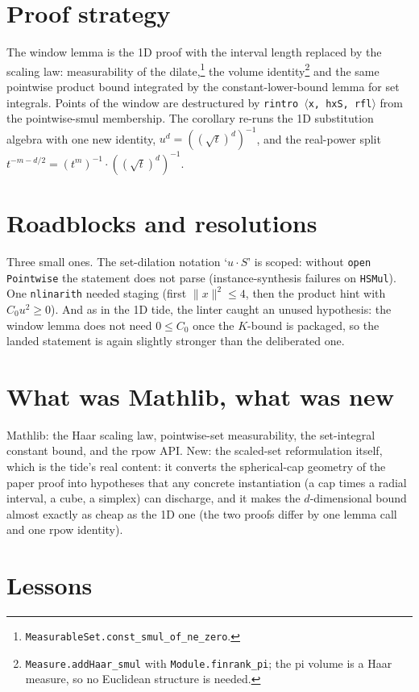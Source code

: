 \documentclass[11pt]{article}
\begin{document}
\section{Proof strategy}

The window lemma is the 1D proof with the interval length replaced by the
scaling law: measurability of the dilate,\footnote{%
\texttt{MeasurableSet.const\_smul\_of\_ne\_zero}.} the volume
identity\footnote{\texttt{Measure.addHaar\_smul} with
\texttt{Module.finrank\_pi}; the pi volume is a Haar measure, so no
Euclidean structure is needed.} and the same pointwise product bound
integrated by the constant-lower-bound lemma for set integrals. Points of
the window are destructured by \texttt{rintro
\(\langle\)x, hxS, rfl\(\rangle\)} from the pointwise-smul membership. The
corollary re-runs the 1D substitution algebra with one new identity,
$u^d = ((\sqrt t)^d)^{-1}$, and the real-power split
$t^{-m - d/2} = (t^m)^{-1} \cdot ((\sqrt t)^d)^{-1}$.

\section{Roadblocks and resolutions}

Three small ones. The set-dilation notation `$u \cdot S$' is scoped: without
\texttt{open Pointwise} the statement does not parse (instance-synthesis
failures on \texttt{HSMul}). One \texttt{nlinarith} needed staging (first
$\|x\|^2 \leq 4$, then the product hint with $C_0 u^2 \geq 0$). And as in the
1D tide, the linter caught an unused hypothesis: the window lemma does not
need $0 \leq C_0$ once the $K$-bound is packaged, so the landed statement is
again slightly stronger than the deliberated one.

\section{What was Mathlib, what was new}

Mathlib: the Haar scaling law, pointwise-set measurability, the set-integral
constant bound, and the rpow API. New: the scaled-set reformulation itself,
which is the tide's real content: it converts the spherical-cap geometry of
the paper proof into hypotheses that any concrete instantiation (a cap times
a radial interval, a cube, a simplex) can discharge, and it makes the
$d$-dimensional bound almost exactly as cheap as the 1D one (the two proofs
differ by one lemma call and one rpow identity).

\section{Lessons}
\end{document}
